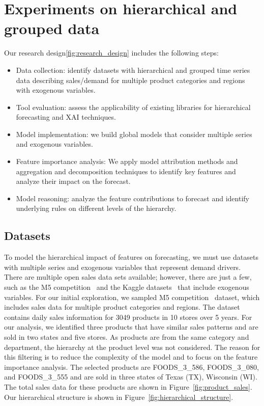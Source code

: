 
\section{Experiments on hierarchical and grouped data}
\label{sec:experiments_on_hierarchical_and_grouped_data}

Our  research design\ref{fig:research_design} includes the following steps:
\begin{itemize}
    \item Data collection: identify datasets with hierarchical and grouped time series data describing sales/demand for multiple product categories and regions with exogenous variables.
    \item Tool evaluation: assess the applicability of existing libraries for hierarchical forecasting and XAI techniques.
    \item Model implementation: we build global models that consider multiple series and exogenous variables.
    \item Feature importance analysis: We apply model attribution methods and aggregation and decomposition techniques to identify key features and analyze their impact on the forecast.
    \item Model reasoning: analyze the feature contributions to forecast and identify underlying rules on different levels of the hierarchy.
\end{itemize}




\subsection{Datasets}
To model the hierarchical impact of features on forecasting, we must use datasets with multiple series and exogenous variables that represent demand drivers.
There are multiple open sales data sets available; however, there are just a few, such as the M5 competition~\citep{makridakis_m5_2022} and the Kaggle datasets~\citep{favorita-sales} that include exogenous variables.
For our initial exploration, we sampled M5 competition~\citep{makridakis_m5_2022} dataset, which includes sales data for multiple product categories and regions.
The dataset contains daily sales information for 3049 products in 10 stores over 5 years.
For our analysis, we identified three products that have similar sales patterns and are sold in two states and five stores.
As products are from the same category and department, the hierarchy at the product level was not considered.
The reason for this filtering is to reduce the complexity of the model and to focus on the feature importance analysis.
The selected products are FOODS\_3\_586, FOODS\_3\_080, and FOODS\_3\_555 and are sold in three states of Texas (TX), Wisconsin (WI).
The total sales data for these products are shown in Figure~\ref{fig:product_sales}.
Our hierarchical structure is shown in Figure~\ref{fig:hierarchical_structure}.


